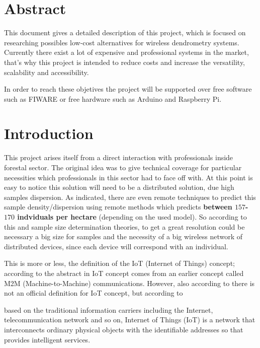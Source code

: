 \documentclass[11pt,a4paper,dvipsnames,twoside]{article}
\newcommand{\doubt}[1] {\textbf{\color{Red3}#1}}
\begin{document}
\newpage

\section*{Abstract}
%
This document gives a detailed description of this project, which is focused on researching possibles low-cost alternatives for wireless dendrometry systems. Currently there exist a lot of expensive and professional systems in the market, that's why this project is intended to reduce costs and increase the versatility, scalability and accessibility.

In order to reach these objetives the project will be supported over free software such as FIWARE\cite{Fiware} or free hardware such as Arduino\cite{Arduino} and Raspberry Pi\cite{Raspberrypi}.

\section{Introduction}
This project arises itself from a direct interaction with professionals inside forestal sector. The original idea was to give technical coverage for particular necessities which professionals in this sector had to face off with. At this point is easy to notice this solution will need to be a distributed solution, due high samples dispersion. As indicated, there are even remote techniques to predict this sample density/dispersion using remote methods which predicts \doubt{between $157$-$170$ indviduals per hectare}\cite{ForestStandVol} (depending on the used model). So according to this and sample size determination theories, to get a great resolution could be necessary a big size for samples and the necessity of a big wireless network of distributed devices, since each device will correspond with an individual.

This is more or less, the definition of the IoT (Internet of Things) concept; according to the abstract in \cite{IoTOverview} IoT concept comes from an earlier concept called M2M (Machine-to-Machine) communications. However, also according to \cite[p.~1(71)]{IoTOverview} there is not an official definition for IoT concept, but according to \cite[p.~2(920)]{IoTObjetives}

\begin{quoting}
  based on the traditional information carriers including the Internet, telecommunication  network  and  so  on,  Internet  of Things (IoT) is a network that interconnects ordinary physical  objects  with  the identifiable addresses  so that provides intelligent services.
\end{quoting}
\end{document}
